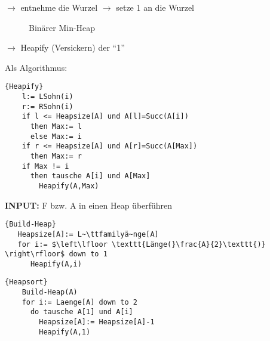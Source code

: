 \documentclass[ngerman,draft,parskip=half*,twoside]{scrreprt}
\theoremstyle{break}
\theoremstyle{nonumberbreak}
\begin{document}
$\rightarrow$ entnehme die Wurzel \hspace{5cm}
$\rightarrow$ setze 1 an die Wurzel

\begin{figure}[H]
	\centering\hspace{6mm}\hspace{6mm}
	\caption{Binärer Min-Heap}
	\label{101103f}
\end{figure}
$\rightarrow$ Heapify (Versickern) der "`1"' 

Als Algorithmus:
  \begin{Algorithmus}[ht]
  \begin{lstlisting}[frame=tlrb, mathescape=true, title=\textsc{Heapify\textnormal{(A)}}, gobble=4]{Heapify}
    l:= LSohn(i)
    r:= RSohn(i)
    if l <= Heapsize[A] und A[l]=Succ(A[i])
      then Max:= l
      else Max:= i
    if r <= Heapsize[A] und A[r]=Succ(A[Max])
      then Max:= r
    if Max != i
      then tausche A[i] und A[Max]
        Heapify(A,Max) 
    \end{lstlisting}
  \end{Algorithmus}

\textbf{INPUT:} F bzw. A in einen Heap überführen
\begin{Algorithmus}[ht]
\begin{lstlisting}[frame=tlrb, mathescape=true, title=\textsc{Build-Heap\textnormal{(A)}}, gobble=2]{Build-Heap}  
   Heapsize[A]:= L~\ttfamilyä~nge[A]
   for i:= $\left\lfloor \texttt{Länge(}\frac{A}{2}\texttt{)} \right\rfloor$ down to 1
      Heapify(A,i)
    \end{lstlisting}
  \end{Algorithmus}

  \begin{Algorithmus}[ht]
\begin{lstlisting}[frame=tlrb, mathescape=true, title=\textsc{Heapsort\textnormal{(A)}}, gobble=4]{Heapsort}
    Build-Heap(A)
    for i:= Laenge[A] down to 2
      do tausche A[1] und A[i]
        Heapsize[A]:= Heapsize[A]-1
        Heapify(A,1)
    \end{lstlisting}
  \end{Algorithmus}
  
\end{document}
